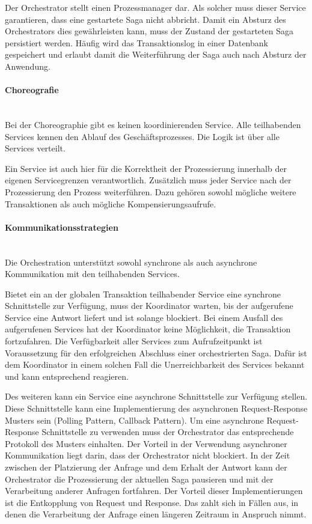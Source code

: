 Der Orchestrator stellt einen Prozessmanager dar. Als solcher muss dieser Service garantieren, dass eine gestartete Saga nicht abbricht. Damit ein Absturz des Orchestrators dies gewährleisten kann, muss der Zustand der gestarteten Saga persistiert werden. Häufig wird das Transaktionslog in einer Datenbank gespeichert und erlaubt damit die Weiterführung der Saga auch nach Absturz der Anwendung. 

\paragraph*{Choreografie} \mbox{}\\
Bei der Choreographie gibt es keinen koordinierenden Service. Alle teilhabenden Services kennen den Ablauf des Geschäftsprozesses. Die Logik ist über alle Services verteilt. 

Ein Service ist auch hier für die Korrektheit der Prozessierung innerhalb der eigenen Servicegrenzen verantwortlich. Zusätzlich muss jeder Service nach der Prozessierung den Prozess weiterführen. Dazu gehören sowohl mögliche weitere Transaktionen als auch mögliche Kompensierungsaufrufe. 


\paragraph*{Kommunikationsstrategien} \mbox{}\\
Die Orchestration unterstützt sowohl synchrone als auch asynchrone Kommunikation mit den teilhabenden Services. 

Bietet ein an der globalen Transaktion teilhabender Service eine synchrone Schnittstelle zur Verfügung, muss der Koordinator warten, bis der aufgerufene Service eine Antwort liefert und ist solange blockiert. Bei einem Ausfall des aufgerufenen Services hat der Koordinator keine Möglichkeit, die Transaktion fortzufahren. Die Verfügbarkeit aller Services zum Aufrufzeitpunkt ist Voraussetzung für den erfolgreichen Abschluss einer orchestrierten Saga. Dafür ist dem Koordinator in einem solchen Fall die Unerreichbarkeit des Services bekannt und kann entsprechend reagieren. 

Des weiteren kann ein Service eine asynchrone Schnittstelle zur Verfügung stellen. Diese Schnittstelle kann eine Implementierung des asynchronen Request-Response Musters sein (Polling Pattern, Callback Pattern). Um eine asynchrone Request-Response Schnittstelle zu verwenden muss der Orchestrator das entsprechende Protokoll des Musters einhalten. Der Vorteil in der Verwendung asynchroner Kommunikation liegt darin, dass der Orchestrator nicht blockiert. In der Zeit zwischen der Platzierung der Anfrage und dem Erhalt der Antwort kann der Orchestrator die Prozessierung der aktuellen Saga pausieren und mit der Verarbeitung anderer Anfragen fortfahren. Der Vorteil dieser Implementierungen ist die Entkopplung von Request und Response. Das zahlt sich in Fällen aus, in denen die Verarbeitung der Anfrage einen längeren Zeitraum in Anspruch nimmt.  


